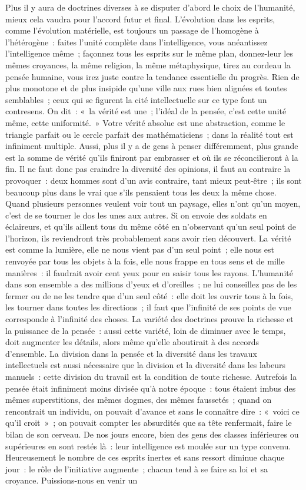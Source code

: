 \documentclass[french,twoside]{book} %
\begin{document}
Plus il y aura de doctrines diverses à se disputer d’abord le choix de l’humanité, mieux cela vaudra pour l’accord futur et final. L’évolution dans les esprits, comme l’évolution matérielle, est toujours un passage de l’homogène à l’hétérogène : faites l’unité complète dans l’intelligence, vous anéantissez l’intelligence même ; façonnez tous les esprits sur le même plan, donnez-leur les mêmes croyances, la même religion, la même métaphysique, tirez au cordeau la pensée humaine, vous irez juste contre la tendance essentielle du progrès. Rien de plus monotone et de plus insipide qu’une ville aux rues bien alignées et toutes semblables ; ceux qui se figurent la cité intellectuelle sur ce type font un contresens. On dit : « la vérité est une ; l’idéal de la pensée, c’est cette unité même, cette uniformité. » Votre vérité absolue est une abstraction, comme le triangle parfait ou le cercle parfait des mathématiciens ; dans la réalité tout est infiniment multiple. Aussi, plus il y a de gens à penser différemment, plus grande est la somme de vérité qu’ils finiront par embrasser et où ils se réconcilieront à la fin. Il ne faut donc pas craindre la diversité des opinions, il faut au contraire la provoquer : deux hommes sont d’un avis contraire, tant mieux peut-être ; ils sont beaucoup plus dans le vrai que s’ils pensaient tous les deux la même chose. Quand plusieurs personnes veulent voir tout un paysage, elles n’ont qu’un moyen, c’est de se tourner le dos les unes aux autres. Si on envoie des soldats en éclaireurs, et qu’ils aillent tous du même côté en n’observant qu’un seul point de l’horizon, ils reviendront très probablement sans avoir rien découvert. La vérité est comme la lumière, elle ne nous vient pas d’un seul point ; elle nous est renvoyée par tous les objets à la fois, elle nous frappe en tous sens et de mille manières : il faudrait avoir cent yeux pour en saisir tous les rayons. L’humanité dans son ensemble a des millions d’yeux et d’oreilles ; ne lui conseillez pas de les fermer ou de ne les tendre que d’un seul côté : elle doit les ouvrir tous à la fois, les tourner dans toutes les directions ; il faut que l’infinité de ses points de vue corresponde à l’infinité des choses. La variété des doctrines prouve la richesse et la puissance de la pensée : aussi cette variété, loin de diminuer avec le temps, doit augmenter les détails, alors même qu’elle aboutirait à des accords d’ensemble. La division dans la pensée et la diversité dans les travaux intellectuels est aussi nécessaire que la division et la diversité dans les labeurs manuels : cette division du travail est la condition de toute richesse. Autrefois la pensée était infiniment moins divisée qu’à notre époque : tous étaient imbus des mêmes superstitions, des mêmes dogmes, des mêmes faussetés ; quand on rencontrait un individu, on pouvait d’avance et sans le connaître dire : « voici ce qu’il croit » ; on pouvait compter les absurdités que sa tête renfermait, faire le bilan de son cerveau. De nos jours encore, bien des gens des classes inférieures ou supérieures en sont restés là : leur intelligence est moulée sur un type convenu. Heureusement le nombre de ces esprits inertes et sans ressort diminue chaque jour : le rôle de l’initiative augmente ; chacun tend à se faire sa loi et sa croyance. Puissions-nous en venir un 
\end{document}
